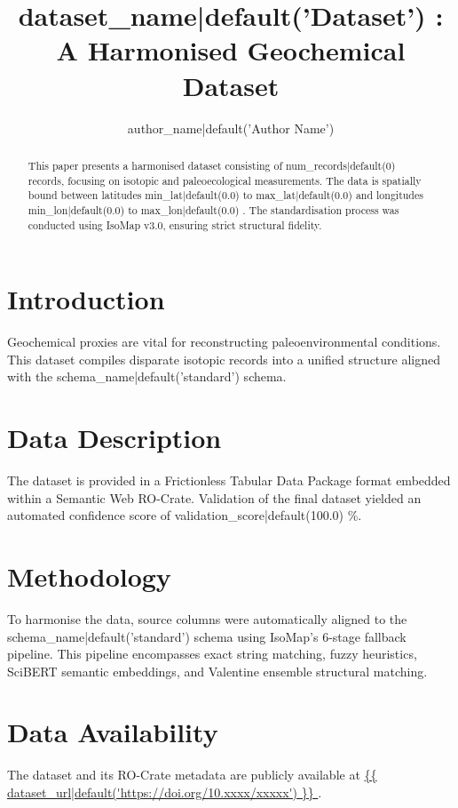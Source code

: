 \documentclass[essd, manuscript]{copernicus}
\begin{document}
\title{ {{ dataset_name|default('Dataset') }} : A Harmonised Geochemical Dataset }
\author[1]{ {{ author_name|default('Author Name') }} }

\maketitle

\begin{abstract}
This paper presents a harmonised dataset consisting of {{ num_records|default(0) }} records, focusing on isotopic and paleoecological measurements. The data is spatially bound between latitudes {{ min_lat|default(0.0) }} to {{ max_lat|default(0.0) }} and longitudes {{ min_lon|default(0.0) }} to {{ max_lon|default(0.0) }}. The standardisation process was conducted using IsoMap v3.0, ensuring strict structural fidelity.
\end{abstract}

\section{Introduction}
Geochemical proxies are vital for reconstructing paleoenvironmental conditions. This dataset compiles disparate isotopic records into a unified structure aligned with the {{ schema_name|default('standard') }} schema.

\section{Data Description}
The dataset is provided in a Frictionless Tabular Data Package format embedded within a Semantic Web RO-Crate.
Validation of the final dataset yielded an automated confidence score of {{ validation_score|default(100.0) }}\%.

\section{Methodology}
To harmonise the data, source columns were automatically aligned to the {{ schema_name|default('standard') }} schema using IsoMap's 6-stage fallback pipeline. This pipeline encompasses exact string matching, fuzzy heuristics, SciBERT semantic embeddings, and Valentine ensemble structural matching.

\section{Data Availability}
The dataset and its RO-Crate metadata are publicly available at \url{ {{ dataset_url|default('https://doi.org/10.xxxx/xxxxx') }} }.
\end{document}
